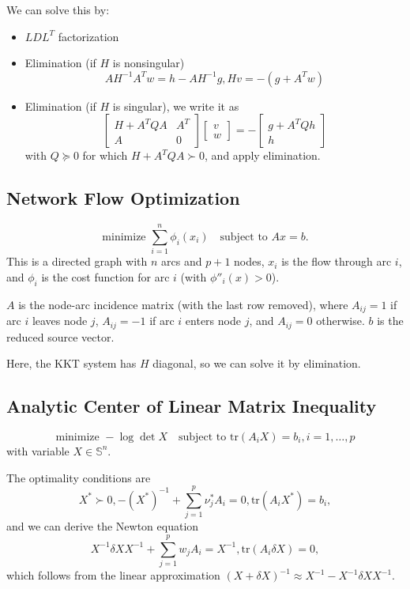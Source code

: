 \documentclass[11pt]{article}
\begin{document}
We can solve this by:
\begin{itemize}
    \item $LDL^T$ factorization
    \item Elimination (if $H$ is nonsingular) 
    \[ AH^{-1}A^Tw = h - AH^{-1}g, Hv = -(g + A^Tw) \] 
    \item Elimination (if $H$ is singular), we write it as 
    \[ \begin{bmatrix}
        H + A^TQA & A^T \\ A & 0
    \end{bmatrix} \begin{bmatrix}
        v \\ w
    \end{bmatrix} = - \begin{bmatrix}
        g + A^TQh \\ h
    \end{bmatrix} \] 
    with $Q \succeq 0$ for which $H + A^TQA \succ 0$, and apply elimination. 
\end{itemize}

\subsection{Network Flow Optimization} 
\[ \text{minimize } \sum_{i=1}^n \phi_i(x_i) \quad \text{subject to } Ax=b. \] 
This is a directed graph with $n$ arcs and $p+1$ nodes, $x_i$ is the flow through arc $i$, and $\phi_i$ is the cost function for arc $i$ (with $\phi''_i(x) > 0$). \par 

$A$ is the node-arc incidence matrix (with the last row removed), where $A_{ij} = 1$ if arc $i$ leaves node $j$, $A_{ij} = -1$ if arc $i$ enters node $j$, and $A_{ij} = 0$ otherwise. $b$ is the reduced source vector. \par 

Here, the KKT system has $H$ diagonal, so we can solve it by elimination. \par

\subsection{Analytic Center of Linear Matrix Inequality} 
\[ \text{minimize } -\log\det X \quad \text{subject to } \mathrm{tr}(A_iX) = b_i, i = 1, \ldots, p \] 
with variable $X \in \mathbb{S}^n$. \par 

The optimality conditions are 
\[ X^* \succ 0, -(X^*)^{-1} + \sum_{j=1}^p \nu_j^* A_i = 0, \mathrm{tr}(A_iX^*) = b_i, \] 
and we can derive the Newton equation 
\[ X^{-1}\delta X X^{-1} + \sum_{j=1}^p w_jA_i = X^{-1}, \mathrm{tr}(A_i\delta X) = 0, \] 
which follows from the linear approximation $(X + \delta X)^{-1} \approx X^{-1} - X^{-1}\delta XX^{-1}$. \par 
\end{document}
